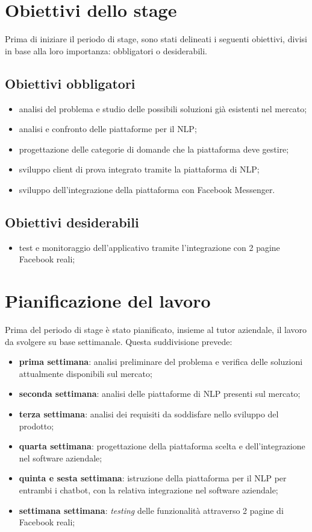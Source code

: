 \section{Obiettivi dello stage}
\label{obiettivi}
Prima di iniziare il periodo di stage, sono stati delineati i seguenti obiettivi, divisi in base alla loro importanza: obbligatori o desiderabili.

\subsection{Obiettivi obbligatori}
\begin{itemize}
	\item analisi del problema e studio delle possibili soluzioni già esistenti nel mercato;
	\item analisi e confronto delle piattaforme per il \gls{NLP};
	\item progettazione delle categorie di domande che la piattaforma deve gestire;
	\item sviluppo client di prova integrato tramite la piattaforma di \gls{NLP};
	\item sviluppo dell'integrazione della piattaforma con Facebook Messenger.
\end{itemize}

\subsection{Obiettivi desiderabili}
\begin{itemize}
	\item test e monitoraggio dell’applicativo tramite l’integrazione con 2 pagine Facebook reali;
\end{itemize}

\section{Pianificazione del lavoro}
Prima del periodo di stage è stato pianificato, insieme al tutor aziendale, il lavoro da svolgere su base settimanale. Questa suddivisione prevede:
\begin{itemize}
	\item \textbf{prima settimana}: analisi preliminare del problema e verifica delle soluzioni attualmente disponibili sul mercato;
	\item \textbf{seconda settimana}: analisi delle piattaforme di \gls{NLP} presenti sul mercato;
	\item \textbf{terza settimana}: analisi dei requisiti da soddisfare nello sviluppo del prodotto;
	\item \textbf{quarta settimana}: progettazione della piattaforma scelta e dell'integrazione nel software aziendale;
	\item \textbf{quinta e sesta settimana}: istruzione della piattaforma per il \gls{NLP} per entrambi i \gls{chatbot}, con la relativa integrazione nel software aziendale;
	\item \textbf{settimana settimana}: \emph{testing} delle funzionalità attraverso 2 pagine di Facebook reali;
\end{itemize}

